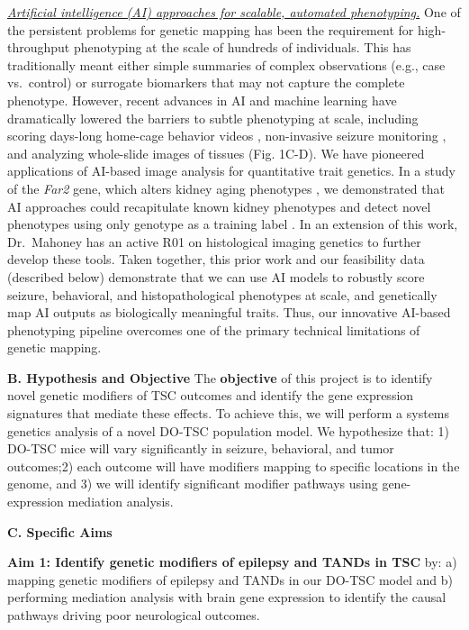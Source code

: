 \documentclass[
  12pt,
]{article}
\begin{document}
\textit{\underline{Artificial intelligence (AI) approaches for scalable, automated phenotyping.}}
One of the persistent problems for genetic mapping has been the
requirement for high-throughput phenotyping at the scale of hundreds of
individuals. This has traditionally meant either simple summaries of
complex observations (e.g., case vs.~control) or surrogate biomarkers
that may not capture the complete phenotype. However, recent advances in
AI and machine learning have dramatically lowered the barriers to subtle
phenotyping at scale, including scoring days-long home-cage behavior
videos
\cite{30127430, 26687221, 30573820, 31570119, 29779950, 37091193, 34718812, 35021077, 33729153},
non-invasive seizure monitoring \cite{36841241}, and analyzing
whole-slide images of tissues \cite{35202643, 31308507} (Fig. 1C-D). We
have pioneered applications of AI-based image analysis for quantitative
trait genetics. In a study of the \textit{Far2} gene, which alters
kidney aging phenotypes \cite{29652635}, we demonstrated that AI
approaches could recapitulate known kidney phenotypes and detect novel
phenotypes using only genotype as a training label \cite{31220455}. In
an extension of this work, Dr.~Mahoney has an active R01 on histological
imaging genetics to further develop these tools. Taken together, this
prior work and our feasibility data (described below) demonstrate that
we can use AI models to robustly score seizure, behavioral, and
histopathological phenotypes at scale, and genetically map AI outputs as
biologically meaningful traits. Thus, our innovative AI-based
phenotyping pipeline overcomes one of the primary technical limitations
of genetic mapping.

\textbf{B. Hypothesis and Objective} The \textbf{objective} of this
project is to identify novel genetic modifiers of TSC outcomes and
identify the gene expression signatures that mediate these effects. To
achieve this, we will perform a systems genetics analysis of a novel
DO-TSC population model. We hypothesize that: 1) DO-TSC mice will vary
significantly in seizure, behavioral, and tumor outcomes;2) each outcome
will have modifiers mapping to specific locations in the genome, and 3)
we will identify significant modifier pathways using gene-expression
mediation analysis.

\textbf{C. Specific Aims}

\textbf{Aim 1: Identify genetic modifiers of epilepsy and TANDs in TSC}
by: a) mapping genetic modifiers of epilepsy and TANDs in our DO-TSC
model and b) performing mediation analysis with brain gene expression to
identify the causal pathways driving poor neurological outcomes.
\end{document}
